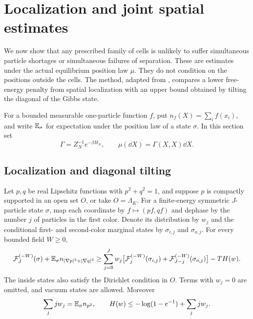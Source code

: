 \section{Localization and joint spatial estimates}\label{sec:spatial}

We now show that any prescribed family of cells is unlikely to suffer
simultaneous particle shortages or simultaneous failures of separation.
These are estimates under the actual equilibrium position law $\mu$.
They do not condition on the positions outside the cells. The method,
adapted from \citet[Section~4]{B}, compares a lower free-energy penalty
from spatial localization with an upper bound obtained by tilting the
diagonal of the Gibbs state.

For a bounded measurable one-particle function $f$, put
$n_f(X)=\sum_i f(x_i)$, and write $\mathbb E_\sigma$ for expectation under
the position law of a state $\sigma$. In this section set
\[
 \Gamma=Z_N^{-1}e^{-\beta H_N},\qquad
 \mu(\dd X)=\Gamma(X,X)\dd X.
\]

\subsection{Localization and diagonal tilting}

\begin{lemma}\label{lem:localization}
Let $p,q$ be real Lipschitz functions with $p^2+q^2=1$, and suppose
$p$ is compactly supported in an open set $O$, or take $O=\Lambda_K$.
For a finite-energy symmetric $J$-particle state $\sigma$, map each
coordinate by $f\mapsto(pf,qf)$ and dephase by the number $j$ of
particles in the first color. Denote its distribution by $w_j$ and
the conditional first- and second-color marginal states by
$\sigma_{i,j}$ and $\sigma_{o,j}$. For every bounded field $W\ge0$,
\begin{equation}\label{eq:two-color}
 \begin{split}
 \mathcal F_J^{(-W)}(\sigma)
  +\mathbb E_\sigma n_{|\nabla p|^2+|\nabla q|^2}
 \ge\sum_{j=0}^Jw_j\bigl[
  \mathcal F_j^{(-W)}(\sigma_{i,j})+
  \mathcal F_{J-j}^{(-W)}(\sigma_{o,j})\bigr]-TH(w).
 \end{split}
\end{equation}
The inside states also satisfy the Dirichlet condition in $O$. Terms
with $w_j=0$ are omitted, and vacuum states are allowed. Moreover
\begin{equation}\label{eq:color-entropy}
 \sum_jjw_j=\mathbb E_\sigma n_{p^2},\qquad
 H(w)\le-\log(1-e^{-1})+\sum_jjw_j.
\end{equation}
\end{lemma}

